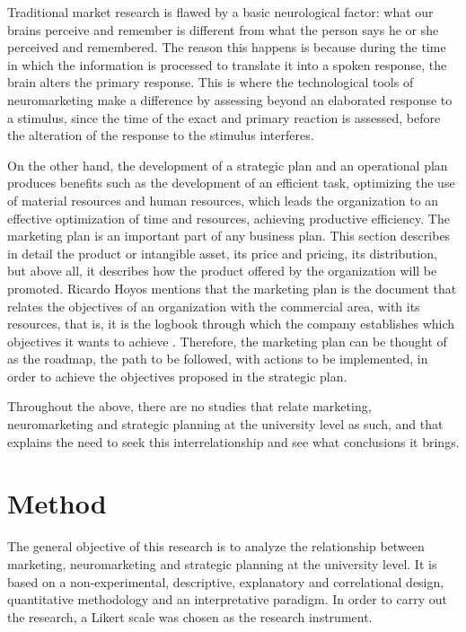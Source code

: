 \documentclass[english]{textolivre}
\begin{document}
Traditional market research is flawed by a basic neurological factor: what our brains perceive and remember is different from what the person says he or she perceived and remembered. The reason this happens is because during the time in which the information is processed to translate it into a spoken response, the brain alters the primary response.  This is where the technological tools of neuromarketing make a difference by assessing beyond an elaborated response to a stimulus, since the time of the exact and primary reaction is assessed, before the alteration of the response to the stimulus interferes. 

On the other hand, the development of a strategic plan and an operational plan produces benefits such as the development of an efficient task, optimizing the use of material resources and human resources, which leads the organization to an effective optimization of time and resources, achieving productive efficiency. The marketing plan is an important part of any business plan. This section describes in detail the product or intangible asset, its price and pricing, its distribution, but above all, it describes how the product offered by the organization will be promoted. Ricardo Hoyos mentions that the marketing plan is the document that relates the objectives of an organization with the commercial area, with its resources, that is, it is the logbook through which the company establishes which objectives it wants to achieve \cite{hoyos_ballesteros_marketing_2013}. Therefore, the marketing plan can be thought of as the roadmap, the path to be followed, with actions to be implemented, in order to achieve the objectives proposed in the strategic plan.

Throughout the above, there are no studies that relate marketing, neuromarketing and strategic planning at the university level as such, and that explains the need to seek this interrelationship and see what conclusions it brings.

\section{Method}

The general objective of this research is to analyze the relationship between marketing, neuromarketing and strategic planning at the university level. It is based on a non-experimental, descriptive, explanatory and correlational design, quantitative methodology and an interpretative paradigm. In order to carry out the research, a Likert scale was chosen as the research instrument.
\end{document}
